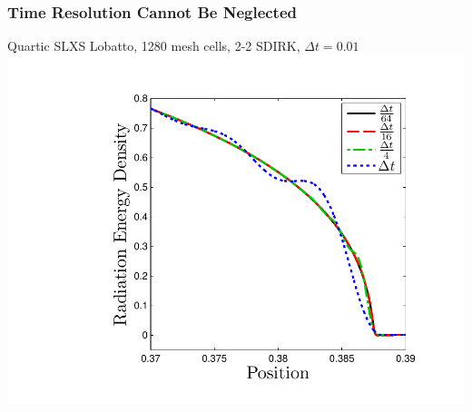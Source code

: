 \documentclass{beamer}
\begin{document}
\begin{frame}
\frametitle{Time Resolution Cannot Be Neglected}
\centering
Quartic SLXS Lobatto, 1280 mesh cells, 2-2 SDIRK, $\Delta t = 0.01$
\\
\vspace{0.1in}
\includegraphics[width=0.9\textheight,trim=1.0in  0.2in 0.5in 0.5in,clip=true]{../chapter6_grey_radtran/Dissertation_Data/Time_Refinement_Zoom_Radiation.pdf}
\end{frame}
\end{document}
